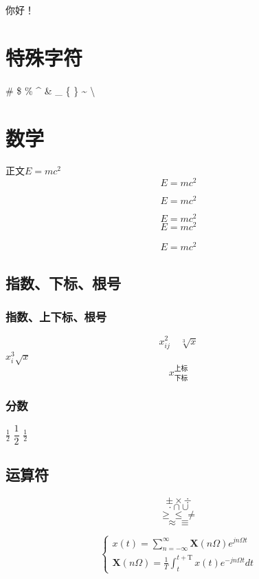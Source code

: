 \documentclass[12pt]{ctexart} %
\begin{document}
      你好！
     
\section{特殊字符}
\# \$ \% \^{} \& \_ \{ \} \~{} \textbackslash

\section{数学}
正文$E = mc^2$%
$$E = mc^2$$%

\begin{equation}
E=mc^2
\end{equation}

\[ E=mc^2 \]
\[ \boxed{E=mc^2} \]

\begin{align}
    E = mc^2
\end{align}

\subsection{指数、下标、根号}
\subsubsection{指数、上下标、根号}
\[x_{ij}^2\quad \sqrt[3]{x}\]
$ x_i^3 \sqrt{x} $
\[x_{\text{下标}}^{\text{上标}} \]

\subsubsection{分数}
$\frac{1}{2}$ \quad $ \dfrac{1}{2}$ \quad $ \tfrac{1}{2}$
\subsection{运算符}

\[\pm \times \div\] 
\[\cdot \cap \cup\] 
\[ \geq \leq \neq \] 
\[\approx \equiv\]

$$
\left\{\begin{array}{c}
x(t)=\displaystyle \sum_{n=-\infty}^{\infty} \boldsymbol{X}(n \Omega) e^{j n \Omega t} \\
\boldsymbol{X}(n \Omega)=\frac{1}{T} \int_{t}^{t+\mathrm{T}} x(t) e^{-j n \Omega t} d t
\end{array}\right.
$$
\end{document}
